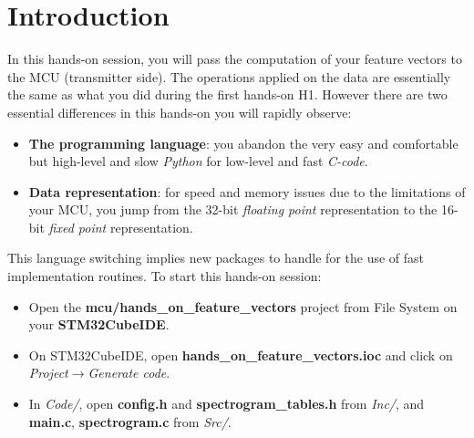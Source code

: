 \section*{Introduction}
%
In this hands-on session, you will pass the computation of your feature vectors to the MCU (transmitter side).
The operations applied on the data are essentially the same as what you did during the first hands-on H1.
However there are two essential differences in this hands-on you will rapidly observe:
\begin{itemize}
    \item \textbf{The programming language}: you abandon the very easy and comfortable but high-level and slow \emph{Python} for low-level and fast \emph{C-code}.
    \item \textbf{Data representation}: for speed and memory issues due to the limitations of your MCU, you jump from the 32-bit \emph{floating point} representation to the 16-bit \emph{fixed point} representation.
\end{itemize}
%
This language switching implies new packages to handle for the use of fast implementation routines.
To start this hands-on session:
\begin{itemize}
    \item Open the \textbf{mcu/hands\_on\_feature\_vectors} project from File System on your \textbf{STM32CubeIDE}.
    \item On STM32CubeIDE, open \textbf{hands\_on\_feature\_vectors.ioc} and click on \emph{Project$\rightarrow$Generate code}.
    \item In \emph{Code/}, open \textbf{config.h} and \textbf{spectrogram\_tables.h} from \emph{Inc/}, and \textbf{main.c}, \textbf{spectrogram.c} from \emph{Src/}.
\end{itemize}
